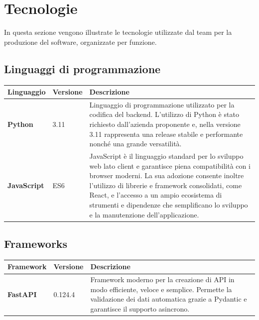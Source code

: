 \documentclass[a4paper,12pt]{article}
\begin{document}
    \section{Tecnologie}
    In questa sezione vengono illustrate le tecnologie utilizzate dal team per la produzione del software, organizzate per funzione.

        \subsection{Linguaggi di programmazione}
        \begin{center}
            \begin{tabularx}{\textwidth}{|l|l|X|}
                \hline
                \rowcolor{gold}
                \textbf{Linguaggio}  & \textbf{Versione}       & \textbf{Descrizione}                                          \\
                \hline
                \textbf{Python} & 3.11 & Linguaggio di programmazione utilizzato per la codifica del backend. L'utilizzo di Python è stato richiesto dall'azienda proponente e, nella versione 3.11 rappresenta una release stabile e performante nonché una grande versatilità.\\
                \hline
                \textbf{JavaScript} & ES6 & JavaScript è il linguaggio standard per lo sviluppo web lato client e garantisce piena compatibilità con i browser moderni. La sua adozione consente inoltre l'utilizzo di librerie e framework consolidati, come React, e l'accesso a un ampio ecosistema di strumenti e dipendenze che semplificano lo sviluppo e la manutenzione dell'applicazione.\\
                \hline
            \end{tabularx}
        \end{center}

        \subsection{Frameworks}
        \begin{center}
            \begin{tabularx}{\textwidth}{|l|l|X|}
                \hline
                \rowcolor{gold}
                \textbf{Framework}  & \textbf{Versione}  & \textbf{Descrizione}   \\
                \hline
                \textbf{FastAPI} & 0.124.4 & Framework moderno per la creazione di API in modo efficiente, veloce e semplice. Permette la validazione dei dati automatica grazie a Pydantic e garantisce il supporto asincrono.\\
                \hline
            \end{tabularx}
        \end{center}
\end{document}
